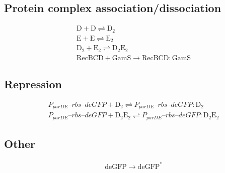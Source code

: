 \documentclass[english]{report}
\begin{document}
\subsection{Protein complex association/dissociation}

\begin{align}
& \mathrm{D} + \mathrm{D} \rightleftharpoons \mathrm{D_2} \\
& \mathrm{E} + \mathrm{E} \rightleftharpoons \mathrm{E_2} \\
& \mathrm{D_2} + \mathrm{E_2} \rightleftharpoons \mathrm{D_2E_2} \\
& \mathrm{RecBCD} + \mathrm{GamS} \rightarrow \mathrm{RecBCD}\!:\!\mathrm{GamS} 
\end{align}

\subsection{Repression}

\begin{align}
& P_{parDE}\textrm{--}rbs\textrm{--}deGFP + \mathrm{D_2} \rightleftharpoons P_{parDE}\textrm{--}rbs\textrm{--}deGFP\!:\!\mathrm{D_2} \\
& P_{parDE}\textrm{--}rbs\textrm{--}deGFP + \mathrm{D_2E_2} \rightleftharpoons P_{parDE}\textrm{--}rbs\textrm{--}deGFP\!:\!\mathrm{D_2E_2}
\end{align}

\subsection{Other}

\begin{align}
& \mathrm{deGFP} \rightarrow \mathrm{deGFP^*}
\end{align}
\end{document}
